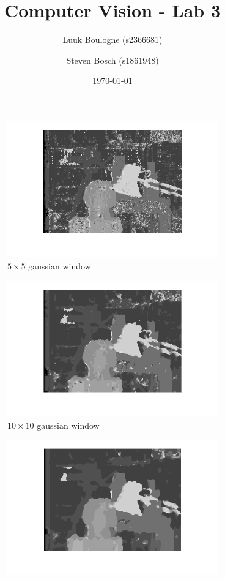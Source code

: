 \documentclass{article}
\title{Computer Vision - Lab 3}
\author{Luuk Boulogne (s2366681) \and Steven Bosch (s1861948)}
\date{\today}
\begin{document}
\maketitle

\begin{figure}[ht!]
 \centering
 \begin{subfigure}{.3\textwidth}
  \centering
  \includegraphics[width=\linewidth]{ex3/a5_5g.png}
  \caption{$5\times5$ gaussian window}
  \label{fig_a1}
 \end{subfigure}
 \begin{subfigure}{.3\textwidth}
  \centering
  \includegraphics[width=\linewidth]{ex3/a10_10g.png}
  \caption{$10\times10$ gaussian window}
  \label{fig_a2}
 \end{subfigure}
 \begin{subfigure}{.3\textwidth}
  \centering
  \includegraphics[width=1\linewidth]{ex3/a15_15g.png}

\end{subfigure}
\end{figure}
\end{document}
